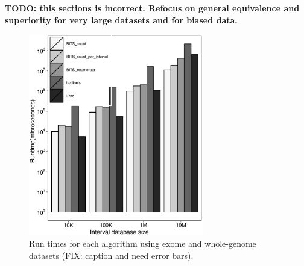 \documentclass{bioinfo}
\begin{document}
		
		\textbf{TODO: this sections is incorrect.  Refocus on general equivalence
		and superiority for very large datasets and for biased data.}
		

		\begin{figure}[h]
			\centering
			\includegraphics[width=3in]{figures/genome-v-exome.eps}
			\caption[]{Run times for each algorithm using exome and whole-genome datasets (FIX: caption and need error bars).}
		\end{figure}
		
\end{document}
